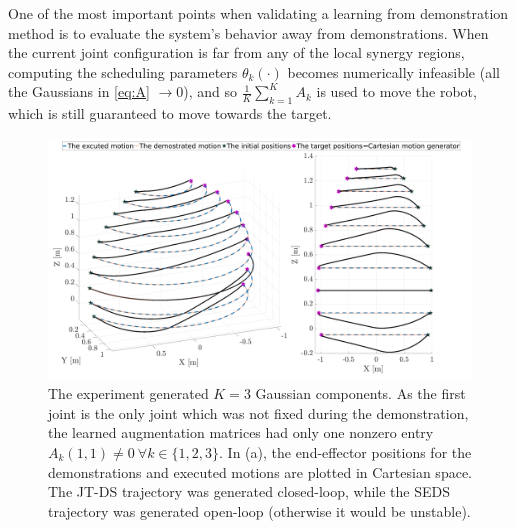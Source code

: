 \documentclass[letterpaper, 10 pt, conference,fleqn]{ieeeconf}
\begin{document}
One of the most important points when validating a learning from demonstration method is to evaluate the system's behavior away from demonstrations.
 When the current joint configuration is far from any of the local synergy regions, computing the scheduling parameters $\theta_k(\cdot)$ becomes numerically infeasible (all the Gaussians in \eqref{eq:A} $\rightarrow 0$), and so $\frac{1}{K}\sum\limits_{k=1}^{K}A_k$ is used to move the robot, which is still guaranteed to move towards the target. %

\begin{figure}[t]
		\includegraphics[width=\linewidth]{../Pic/cropped_Sing_1.pdf}
	\caption{The experiment generated $K=3$ Gaussian components. As the first joint is the only joint which was not fixed during the demonstration, the learned augmentation matrices had only one nonzero entry $A_k(1,1)\neq0~\forall k\in \{1, 2, 3\} $.  In (a), the end-effector positions for the demonstrations and executed motions are plotted in Cartesian space. The JT-DS trajectory was generated closed-loop, while the SEDS trajectory was generated open-loop (otherwise it would be unstable).} %
			\label{fig:Sin}
	\vspace{-20pt}
\end{figure}
\end{document}
